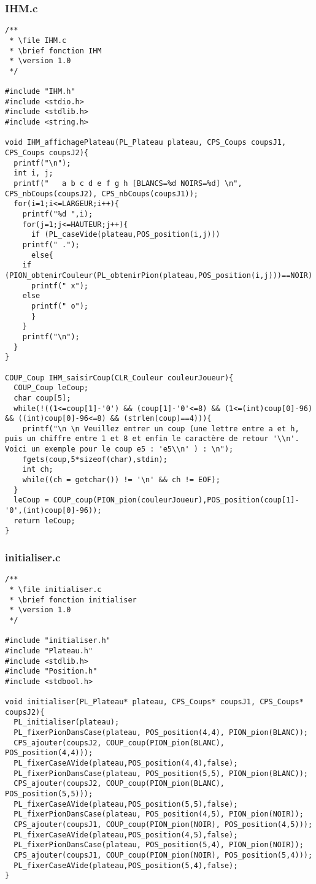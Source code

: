 \subsubsection{IHM.c}
\begin{lstlisting}
/**
 * \file IHM.c
 * \brief fonction IHM
 * \version 1.0
 */

#include "IHM.h"
#include <stdio.h>
#include <stdlib.h>
#include <string.h>

void IHM_affichagePlateau(PL_Plateau plateau, CPS_Coups coupsJ1, CPS_Coups coupsJ2){
  printf("\n");
  int i, j;
  printf("   a b c d e f g h [BLANCS=%d NOIRS=%d] \n", CPS_nbCoups(coupsJ2), CPS_nbCoups(coupsJ1));
  for(i=1;i<=LARGEUR;i++){
    printf("%d ",i);
    for(j=1;j<=HAUTEUR;j++){
      if (PL_caseVide(plateau,POS_position(i,j)))
	printf(" .");
      else{
	if (PION_obtenirCouleur(PL_obtenirPion(plateau,POS_position(i,j)))==NOIR)
	  printf(" x");
	else
	  printf(" o");
      }
    }
    printf("\n");
  }
}

COUP_Coup IHM_saisirCoup(CLR_Couleur couleurJoueur){
  COUP_Coup leCoup;
  char coup[5];
  while(!((1<=coup[1]-'0') && (coup[1]-'0'<=8) && (1<=(int)coup[0]-96) && ((int)coup[0]-96<=8) && (strlen(coup)==4))){
    printf("\n \n Veuillez entrer un coup (une lettre entre a et h, puis un chiffre entre 1 et 8 et enfin le caractère de retour '\\n'. Voici un exemple pour le coup e5 : 'e5\\n' ) : \n");
    fgets(coup,5*sizeof(char),stdin);
    int ch;
    while((ch = getchar()) != '\n' && ch != EOF);
  }
  leCoup = COUP_coup(PION_pion(couleurJoueur),POS_position(coup[1]-'0',(int)coup[0]-96));
  return leCoup;
}
\end{lstlisting}

\subsubsection{initialiser.c}
\begin{lstlisting}
/**
 * \file initialiser.c
 * \brief fonction initialiser
 * \version 1.0
 */

#include "initialiser.h"
#include "Plateau.h"
#include <stdlib.h>
#include "Position.h"
#include <stdbool.h>

void initialiser(PL_Plateau* plateau, CPS_Coups* coupsJ1, CPS_Coups* coupsJ2){
  PL_initialiser(plateau);
  PL_fixerPionDansCase(plateau, POS_position(4,4), PION_pion(BLANC));
  CPS_ajouter(coupsJ2, COUP_coup(PION_pion(BLANC), POS_position(4,4)));
  PL_fixerCaseAVide(plateau,POS_position(4,4),false);
  PL_fixerPionDansCase(plateau, POS_position(5,5), PION_pion(BLANC));
  CPS_ajouter(coupsJ2, COUP_coup(PION_pion(BLANC), POS_position(5,5)));
  PL_fixerCaseAVide(plateau,POS_position(5,5),false);
  PL_fixerPionDansCase(plateau, POS_position(4,5), PION_pion(NOIR));
  CPS_ajouter(coupsJ1, COUP_coup(PION_pion(NOIR), POS_position(4,5)));
  PL_fixerCaseAVide(plateau,POS_position(4,5),false);
  PL_fixerPionDansCase(plateau, POS_position(5,4), PION_pion(NOIR));
  CPS_ajouter(coupsJ1, COUP_coup(PION_pion(NOIR), POS_position(5,4)));
  PL_fixerCaseAVide(plateau,POS_position(5,4),false);
}
\end{lstlisting}


